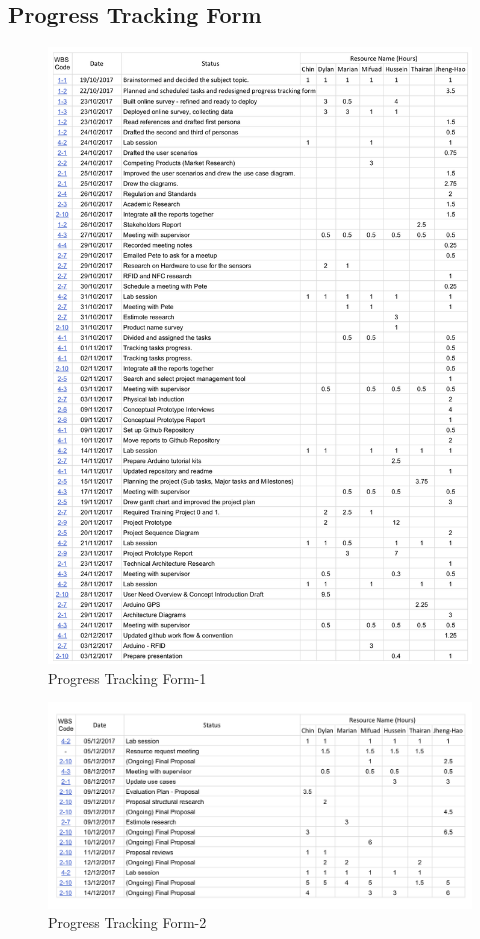 \documentclass[12pt,a4paper]{article}
\begin{document}
\begin{appendices}
    \section{Progress Tracking Form}
      \label{appendix:progess-tracking-form}
      \begin{figure}[H]
        \centering
        \includegraphics[width=.9\textwidth]{assets/12-9-3-progress-tracking-form-1.jpg}
        \caption{Progress Tracking Form-1}
        \label{fig:Progress Tracking Form-1}
      \end{figure}
      \begin{figure}[H]
        \centering
        \includegraphics[width=.9\textwidth]{assets/12-9-3-progress-tracking-form-2.jpg}
        \caption{Progress Tracking Form-2}
        \label{fig:Progress Tracking Form-2}
      \end{figure}


\end{appendices}
\end{document}
